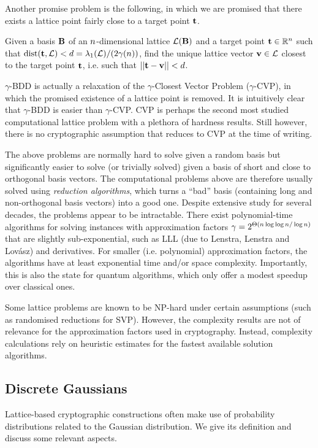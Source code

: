 Another promise problem is the following, in which we are promised that there exists a lattice point fairly close to a target point $\mathbf{t}$. 

\begin{definition}
    Given a basis $\mathbf{B}$ of an $n$-dimensional lattice $\mathcal{L}(\mathbf{B})$ and a target point $\mathbf{t} \in \mathbb{R}^{n}$ such that $\mathrm{dist}(\mathbf{t}, \mathcal{L}) < d = \lambda_1(\mathcal{L})/(2 \gamma(n))$, find the unique lattice vector $\mathbf{v} \in \mathcal{L}$ closest to the target point $\mathbf{t}$, i.e. such that $|| \mathbf{t} - \mathbf{v} || < d$.
\end{definition}

$\gamma$-BDD is actually a relaxation of the $\gamma$-Closest Vector Problem ($\gamma$-CVP), in which the promised existence of a lattice point is removed. It is intuitively clear that $\gamma$-BDD is easier than $\gamma$-CVP. CVP is perhaps the second most studied computational lattice problem with a plethora of hardness results. Still however, there is no cryptographic assumption that reduces to CVP at the time of writing. 

The above problems are normally hard to solve given a random basis but significantly easier to solve (or trivially solved) given a basis of short and close to orthogonal basis vectors. The computational problems above are therefore usually solved using \textit{reduction algorithms}, which turns a ``bad'' basis (containing long and non-orthogonal basis vectors) into a good one. Despite extensive study for several decades, the problems appear to be intractable. There exist polynomial-time algorithms for solving instances with approximation factors $\gamma = 2^{\Theta(n \log \log n / \log n)}$ that are slightly sub-exponential, such as LLL (due to Lenstra, Lenstra and Lovász) and derivatives. For smaller (i.e. polynomial) approximation factors, the algorithms have at least exponential time and/or space complexity. Importantly, this is also the state for quantum algorithms, which only offer a modest speedup over classical ones.

Some lattice problems are known to be NP-hard under certain assumptions (such as randomised reductions for SVP). However, the complexity results are not of relevance for the approximation factors used in cryptography. Instead, complexity calculations rely on heuristic estimates for the fastest available solution algorithms.

\subsection{Discrete Gaussians}
Lattice-based cryptographic constructions often make use of probability distributions related to the Gaussian distribution. We give its definition and discuss some relevant aspects.

